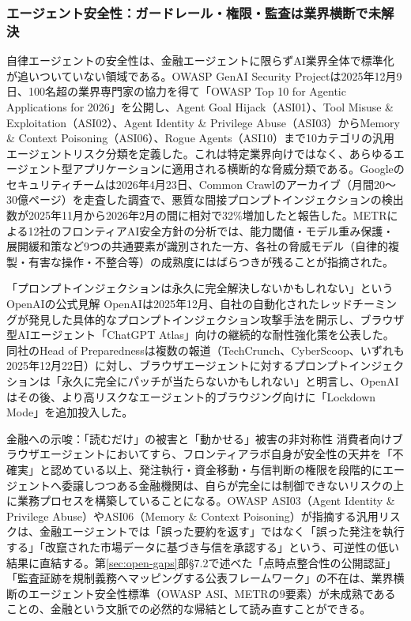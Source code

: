 \subsubsection*{エージェント安全性：ガードレール・権限・監査は業界横断で未解決}

自律エージェントの安全性は、金融エージェントに限らずAI業界全体で標準化が追いついていない領域である。OWASP GenAI Security Projectは2025年12月9日、100名超の業界専門家の協力を得て「OWASP Top 10 for Agentic Applications for 2026」を公開し、Agent Goal Hijack（ASI01）、Tool Misuse \& Exploitation（ASI02）、Agent Identity \& Privilege Abuse（ASI03）からMemory \& Context Poisoning（ASI06）、Rogue Agents（ASI10）まで10カテゴリの汎用エージェントリスク分類を定義した\cite{y07owaspagentic2026}。これは特定業界向けではなく、あらゆるエージェント型アプリケーションに適用される横断的な脅威分類である。Googleのセキュリティチームは2026年4月23日、Common Crawlのアーカイブ（月間20〜30億ページ）を走査した調査で、悪質な間接プロンプトインジェクションの検出数が2025年11月から2026年2月の間に相対で32\%増加したと報告した\cite{y07googlepromptinjection2026}。METRによる12社のフロンティアAI安全方針の分析では、能力閾値・モデル重み保護・展開緩和策など9つの共通要素が識別された一方、各社の脅威モデル（自律的複製・有害な操作・不整合等）の成熟度にはばらつきが残ることが指摘された\cite{y07metrcommon2025}。

\begin{casestudy}{「プロンプトインジェクションは永久に完全解決しないかもしれない」というOpenAIの公式見解}
OpenAIは2025年12月、自社の自動化されたレッドチーミングが発見した具体的なプロンプトインジェクション攻撃手法を開示し、ブラウザ型AIエージェント「ChatGPT Atlas」向けの継続的な耐性強化策を公表した。同社のHead of Preparednessは複数の報道（TechCrunch、CyberScoop、いずれも2025年12月22日）に対し、ブラウザエージェントに対するプロンプトインジェクションは「永久に完全にパッチが当たらないかもしれない」と明言し、OpenAIはその後、より高リスクなエージェント的ブラウジング向けに「Lockdown Mode」を追加投入した\cite{y07openaiatlas2025}。
\end{casestudy}

\begin{insight}{金融への示唆：「読むだけ」の被害と「動かせる」被害の非対称性}
消費者向けブラウザエージェントにおいてすら、フロンティアラボ自身が安全性の天井を「不確実」と認めている以上、発注執行・資金移動・与信判断の権限を段階的にエージェントへ委譲しつつある金融機関は、自らが完全には制御できないリスクの上に業務プロセスを構築していることになる。OWASP ASI03（Agent Identity \& Privilege Abuse）やASI06（Memory \& Context Poisoning）が指摘する汎用リスクは、金融エージェントでは「誤った要約を返す」ではなく「誤った発注を執行する」「改竄された市場データに基づき与信を承認する」という、可逆性の低い結果に直結する。第\ref{sec:open-gaps}部\S7.2で述べた「点時点整合性の公開認証」「監査証跡を規制義務へマッピングする公表フレームワーク」の不在は、業界横断のエージェント安全性標準（OWASP ASI、METRの9要素）が未成熟であることの、金融という文脈での必然的な帰結として読み直すことができる。
\end{insight}

